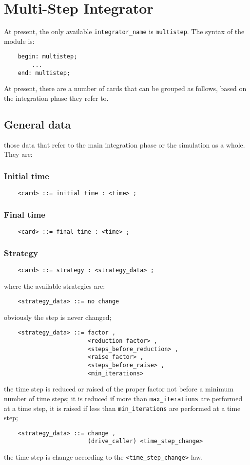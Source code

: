 \section{Multi-Step Integrator}
At present, the only available \texttt{integrator\_name} is \texttt{multistep}.
The syntax of the module is:
\begin{verbatim}
    begin: multistep;
        ...
    end: multistep;
\end{verbatim}
At present, there are a number of cards that can be grouped as follows, 
based on the integration phase they refer to.

\subsection{General data}
those data that refer to the main integration phase or the simulation as a
whole. They are:

\subsubsection{Initial time}
\begin{verbatim}
    <card> ::= initial time : <time> ;
\end{verbatim}

\subsubsection{Final time}
\begin{verbatim}
    <card> ::= final time : <time> ;
\end{verbatim}

\subsubsection{Strategy}
\begin{verbatim}
    <card> ::= strategy : <strategy_data> ;
\end{verbatim}
where the available strategies are:
\begin{verbatim}
    <strategy_data> ::= no change 
\end{verbatim}
obviously the step is never changed;
\begin{verbatim}
    <strategy_data> ::= factor , 
                        <reduction_factor> ,
                        <steps_before_reduction> ,
                        <raise_factor> ,
                        <steps_before_raise> ,
                        <min_iterations>
\end{verbatim}
the time step is reduced or raised of the proper factor not before a
minimum number of time steps; it is reduced if more than 
\texttt{max\_iterations} are performed at a time step, it is raised if less
than \texttt{min\_iterations} are performed at a time step;
\begin{verbatim}
    <strategy_data> ::= change , 
                        (drive_caller) <time_step_change>
\end{verbatim}
the time step is change according to the \texttt{<time\_step\_change>} law.

